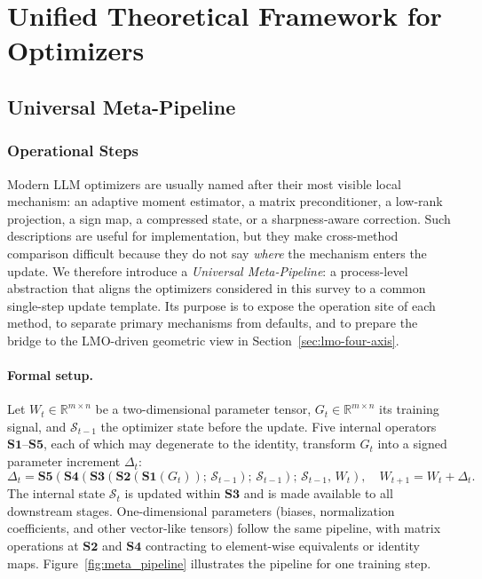 \section{Unified Theoretical Framework for Optimizers}
\label{sec:unified-theoretical-framework}

\subsection{Universal Meta-Pipeline}
\label{sec:meta-pipeline}

\subsubsection{Operational Steps}
\label{sec:meta-pipeline-steps}

Modern LLM optimizers are usually named after their most visible local
mechanism: an adaptive moment estimator, a matrix preconditioner, a low-rank
projection, a sign map, a compressed state, or a sharpness-aware correction.
Such descriptions are useful for implementation, but they make cross-method
comparison difficult because they do not say \emph{where} the mechanism enters
the update.  We therefore introduce a \emph{Universal Meta-Pipeline}: a
process-level abstraction that aligns the optimizers considered in this survey
to a common single-step update template.  Its purpose is to expose the
operation site of each method, to
separate primary mechanisms from defaults, and to prepare the bridge to the
LMO-driven geometric view in Section~\ref{sec:lmo-four-axis}.

\paragraph{Formal setup.}
Let $W_t\in\mathbb{R}^{m\times n}$ be a two-dimensional parameter tensor,
$G_t\in\mathbb{R}^{m\times n}$ its training signal, and
$\mathcal{S}_{t-1}$ the optimizer state before the update.  Five internal
operators $\mathbf{S1}$--$\mathbf{S5}$, each of which may degenerate to the
identity, transform $G_t$ into a signed parameter increment $\Delta_t$:
\begin{equation}
  \Delta_t =
  \mathbf{S5}\!\left(
    \mathbf{S4}\!\left(
      \mathbf{S3}\!\left(
        \mathbf{S2}\!\left(\mathbf{S1}(G_t)\right);\,\mathcal{S}_{t-1}
      \right);\,\mathcal{S}_{t-1}
    \right);\,\mathcal{S}_{t-1},\,W_t
  \right),\quad
  W_{t+1}=W_t+\Delta_t .
  \label{eq:meta_pipeline}
\end{equation}
The internal state $\mathcal{S}_t$ is updated within $\mathbf{S3}$ and is made
available to all downstream stages.  One-dimensional parameters (biases,
normalization coefficients, and other vector-like tensors) follow the same
pipeline, with matrix operations at $\mathbf{S2}$ and $\mathbf{S4}$ contracting
to element-wise equivalents or identity maps.  Figure~\ref{fig:meta_pipeline}
illustrates the pipeline for one training step.

